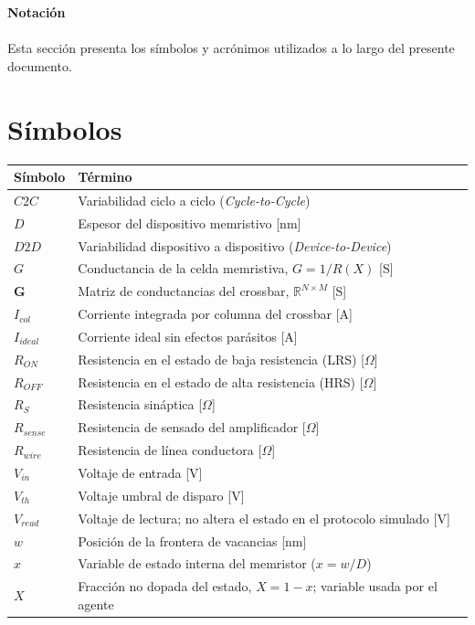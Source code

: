 \textbf{\LARGE Notación}\\\\

Esta sección presenta los símbolos y acrónimos utilizados a lo largo del presente documento.

\renewcommand{\arraystretch}{1.3}

\section*{Símbolos}

\begin{longtable}[l]{>{}l<{}l}
\textbf{Símbolo} & \textbf{Término} \\[0.6ex] \hline
$C2C$      & Variabilidad ciclo a ciclo (\textit{Cycle-to-Cycle}) \\
$D$        & Espesor del dispositivo memristivo [nm] \\
$D2D$      & Variabilidad dispositivo a dispositivo (\textit{Device-to-Device}) \\
$G$        & Conductancia de la celda memristiva, $G=1/R(X)$ [S] \\
$\mathbf{G}$ & Matriz de conductancias del crossbar, $\mathbb{R}^{N\times M}$ [S] \\
$I_{col}$  & Corriente integrada por columna del crossbar [A] \\
$I_{ideal}$ & Corriente ideal sin efectos parásitos [A] \\
$R_{ON}$   & Resistencia en el estado de baja resistencia (LRS) [$\Omega$] \\
$R_{OFF}$  & Resistencia en el estado de alta resistencia (HRS) [$\Omega$] \\
$R_S$      & Resistencia sináptica [$\Omega$] \\
$R_{sense}$ & Resistencia de sensado del amplificador [$\Omega$] \\
$R_{wire}$ & Resistencia de línea conductora [$\Omega$] \\
$V_{in}$   & Voltaje de entrada [V] \\
$V_{th}$   & Voltaje umbral de disparo [V] \\
$V_{read}$ & Voltaje de lectura; no altera el estado en el protocolo simulado [V] \\
$w$        & Posición de la frontera de vacancias [nm] \\
$x$        & Variable de estado interna del memristor ($x = w/D$) \\
$X$        & Fracción no dopada del estado, $X=1-x$; variable usada por el agente \\

\end{longtable}
